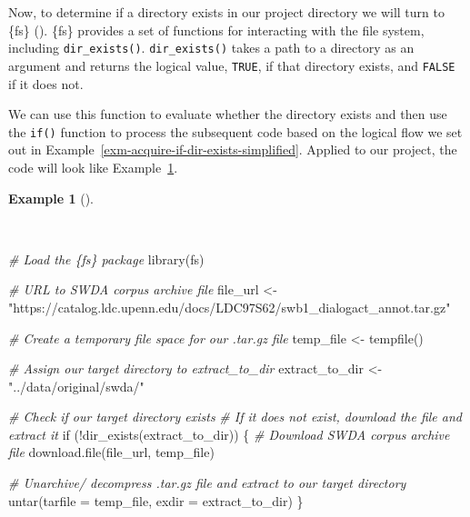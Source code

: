 \documentclass[
  letterpaper,
]{book}
\newenvironment{Shaded}{\begin{snugshade}}{\end{snugshade}}
\newcommand{\AttributeTok}[1]{\textcolor[rgb]{0.00,0.00,0.00}{#1}}
\newcommand{\CommentTok}[1]{\textcolor[rgb]{0.00,0.00,0.00}{\textit{#1}}}
\newcommand{\ControlFlowTok}[1]{\textcolor[rgb]{0.00,0.00,0.00}{#1}}
\newcommand{\FunctionTok}[1]{\textcolor[rgb]{0.00,0.00,0.00}{#1}}
\newcommand{\NormalTok}[1]{\textcolor[rgb]{0.00,0.00,0.00}{#1}}
\newcommand{\OtherTok}[1]{\textcolor[rgb]{0.00,0.00,0.00}{#1}}
\newcommand{\SpecialCharTok}[1]{\textcolor[rgb]{0.00,0.00,0.00}{#1}}
\newcommand{\StringTok}[1]{\textcolor[rgb]{0.00,0.00,0.00}{#1}}
\theoremstyle{definition}
\newtheorem{example}{Example}[chapter]
\theoremstyle{remark}
\begin{document}
Now, to determine if a directory exists in our project directory we will
turn to \{fs\} ().
\{fs\} provides a set of functions for interacting with the file system,
including \texttt{dir\_exists()}. \texttt{dir\_exists()} takes a path to
a directory as an argument and returns the logical value, \texttt{TRUE},
if that directory exists, and \texttt{FALSE} if it does not.

We can use this function to evaluate whether the directory exists and
then use the \texttt{if()} function to process the subsequent code based
on the logical flow we set out in
Example~\ref{exm-acquire-if-dir-exists-simplified}. Applied to our
project, the code will look like
Example~\ref{exm-acquire-swda-if-dir-exists}.

\begin{example}[]\protect\hypertarget{exm-acquire-swda-if-dir-exists}{}\label{exm-acquire-swda-if-dir-exists}

~

\begin{Shaded}
\begin{Highlighting}[]
\CommentTok{\# Load the \{fs\} package}
\FunctionTok{library}\NormalTok{(fs)}

\CommentTok{\# URL to SWDA corpus archive file}
\NormalTok{file\_url }\OtherTok{\textless{}{-}}
  \StringTok{"https://catalog.ldc.upenn.edu/docs/LDC97S62/swb1\_dialogact\_annot.tar.gz"}

\CommentTok{\# Create a temporary file space for our .tar.gz file}
\NormalTok{temp\_file }\OtherTok{\textless{}{-}} \FunctionTok{tempfile}\NormalTok{()}

\CommentTok{\# Assign our target directory to \textasciigrave{}extract\_to\_dir\textasciigrave{}}
\NormalTok{extract\_to\_dir }\OtherTok{\textless{}{-}} \StringTok{"../data/original/swda/"}

\CommentTok{\# Check if our target directory exists}
\CommentTok{\# If it does not exist, download the file and extract it}
\ControlFlowTok{if}\NormalTok{ (}\SpecialCharTok{!}\FunctionTok{dir\_exists}\NormalTok{(extract\_to\_dir)) \{}
  \CommentTok{\# Download SWDA corpus archive file}
  \FunctionTok{download.file}\NormalTok{(file\_url, temp\_file)}

  \CommentTok{\# Unarchive/ decompress .tar.gz file and extract to our target directory}
  \FunctionTok{untar}\NormalTok{(}\AttributeTok{tarfile =}\NormalTok{ temp\_file, }\AttributeTok{exdir =}\NormalTok{ extract\_to\_dir)}
\NormalTok{\}}
\end{Highlighting}
\end{Shaded}

\end{example}
\end{document}
